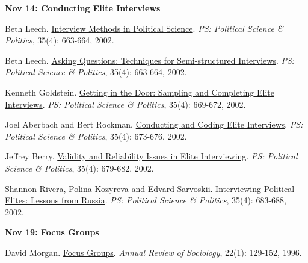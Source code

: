 \documentclass[letterpaper]{article}
\renewenvironment{itemize}{
  \begin{list}{}{
    \setlength{\leftmargin}{1.5em}
  }
}{
  \end{list}
}
\begin{document}
\begin{enumerate}
		\begin{itemize}
		\item {\bf Nov 14: Conducting Elite Interviews}
			\begin{itemize}
				\item[$\bullet$] Beth Leech. \href{https://doi.org/10.1017/S1049096502001117}{Interview Methods in Political Science}. \emph{PS: Political Science \& Politics}, 35(4): 663-664, 2002.
				\item[$\bullet$] Beth Leech. \href{https://dornsife.usc.edu/assets/sites/298/docs/interviewing_techniques_asking_questions.pdf}{Asking Questions: Techniques for Semi-structured Interviews}. \emph{PS: Political Science \& Politics}, 35(4): 663-664, 2002. 
				\item[$\bullet$] Kenneth Goldstein. \href{https://dornsife.usc.edu/assets/sites/298/docs/interviewing_techniques_sampling.pdf}{Getting in the Door: Sampling and Completing Elite Interviews}. \emph{PS: Political Science \& Politics}, 35(4): 669-672, 2002.  
				\item[$\bullet$] Joel Aberbach and Bert Rockman. \href{http://observatory-elites.org/wp-content/uploads/2012/06/Conducting-and-Coding-Elite-Interviews.pdf}{Conducting and Coding Elite Interviews}. \emph{PS: Political Science \& Politics}, 35(4): 673-676, 2002. 
				\item[$\bullet$] Jeffrey Berry. \href{https://doi.org/10.1017/S1049096502001166}{Validity and Reliability Issues in Elite Interviewing}. \emph{PS: Political Science \& Politics}, 35(4): 679-682, 2002. 
				\item[$\bullet$] Shannon Rivera, Polina Kozyreva and Edvard Sarvoskii. \href{https://doi.org/10.1017/S1049096502001178}{Interviewing Political Elites: Lessons from Russia}. \emph{PS: Political Science \& Politics}, 35(4): 683-688, 2002. 
			\end{itemize}
		\end{itemize}


				\begin{itemize}
		\item {\bf Nov 19: Focus Groups}
			\begin{itemize}
				\item[$\bullet$] David Morgan. \href{http://www.jstor.org/stable/2083427}{Focus Groups}. \emph{Annual Review of Sociology}, 22(1): 129-152, 1996.
			\end{itemize}
		\end{itemize}


\end{enumerate}
\end{document}

